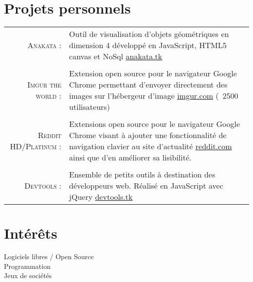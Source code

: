 \documentclass[a4paper,10pt]{article}
\begin{document}
\section{Projets personnels}
\begin{tabular}{r|p{11cm}}
  \textsc{Anakata :}             & Outil de visualisation d'objets géométriques en dimension 4 développé en JavaScript, HTML5 canvas et NoSql \href{http://anakata.tk}{anakata.tk} \\
  \multicolumn{2}{c}{} \\
  \textsc{Imgur the world :}     & Extension open source pour le navigateur Google Chrome permettant d'envoyer directement des images sur l'hébergeur d'image \href{http://imgur.com}{imgur.com} (~2500 utilisateurs)                                            \\
  \multicolumn{2}{c}{} \\     
  \textsc{Reddit HD/Platinum :}  & Extensions open source pour le navigateur Google Chrome visant à ajouter une fonctionnalité de navigation clavier au site d'actualité \href{http://www.reddit.com}{reddit.com} ainsi que d'en améliorer sa lisibilité.     \\
  \multicolumn{2}{c}{} \\   
  \textsc{Devtools :}             & Ensemble de petits outils à destination des développeurs web. Réalisé en JavaScript avec jQuery \href{http://devtools.tk}{devtools.tk} \\
\end{tabular}

\section{Intérêts}
Logiciels libres / Open Source\\
Programmation\\ Jeux de sociétés
\end{document}
